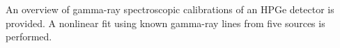 An overview of gamma-ray spectroscopic calibrations of an HPGe detector is
provided. A nonlinear fit using known gamma-ray lines from five sources is
performed.
